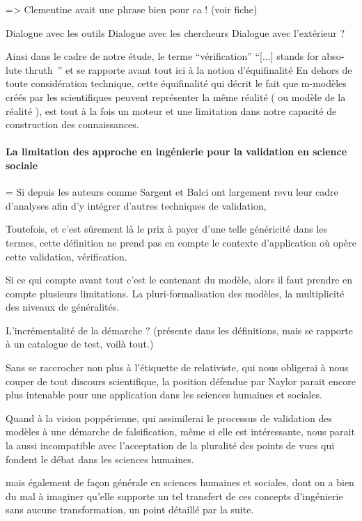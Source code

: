 => Clementine avait une phrase bien pour ca ! (voir fiche)

Dialogue avec les outils
Dialogue avec les chercheurs
Dialogue avec l'extérieur
?

Ainsi dans le cadre de notre étude, le terme \enquote{vérification}  \foreignquote{english}{[...] stands for absolute thruth } \autocite{David2009} \autocite{Oreskes1994} et se rapporte avant tout ici à la notion d'équifinalité \autocite{OSullivan2004} En dehors de toute considération technique, cette équifinalité qui décrit le fait que m-modèles créés par les scientifiques peuvent représenter la même réalité ( ou modèle de la réalité ), est tout à la fois un moteur et une limitation dans notre capacité de construction des connaissances. 


\paragraph{La limitation des approche en ingénierie pour la validation en science sociale}

= Si depuis les auteurs comme Sargent et Balci ont largement revu leur cadre d'analyses afin d'y intégrer d'autres techniques de validation, 

Toutefois, et c'est sûrement là le prix à payer d'une telle généricité dans les termes, cette définition ne prend pas en compte le contexte d'application où opère cette validation, vérification. 

Si ce qui compte avant tout c'est le contenant du modèle, alors il faut prendre en compte plusieurs limitations. La pluri-formalisation des modèles, la multiplicité des niveaux de généralités.

L'incrémentalité de la démarche ? (présente dans les définitions, mais se rapporte à un catalogue de test, voilà tout.)

Sans se raccrocher non plus à l'étiquette de relativiste, qui nous obligerai à nous couper de tout discours scientifique, la position défendue par Naylor parait encore plus intenable pour une application dans les sciences humaines et sociales.

Quand à la vision poppérienne, qui assimilerai le processus de validation des modèles à une démarche de falsification, même si elle est intéressante, nous parait la aussi incompatible avec l'acceptation de la pluralité des points de vues qui fondent le débat dans les sciences humaines.


mais également de façon générale en sciences humaines et sociales, dont on a bien du mal à imaginer qu'elle supporte un tel transfert de ces concepts d’ingénierie sans aucune transformation, un point détaillé par la suite.




